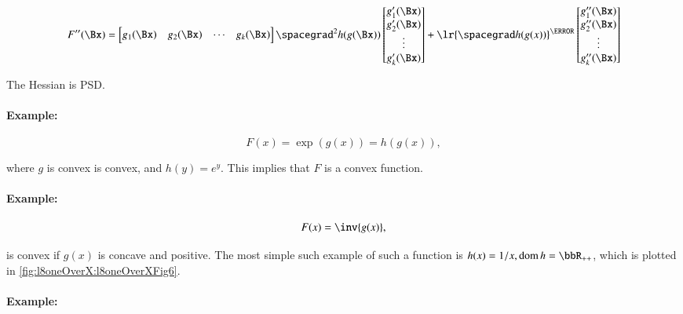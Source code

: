 \begin{equation}\label{eqn:convexOptimizationLecture8:240}
F''(\Bx)
=
\begin{bmatrix}
g_1(\Bx) & g_2(\Bx) & \cdots & g_k(\Bx)
\end{bmatrix}
\spacegrad^2 h(g(\Bx))
\begin{bmatrix}
g_1'(\Bx) \\ g_2'(\Bx) \\ \vdots \\ g_k'(\Bx)
\end{bmatrix}
+
\lr{ \spacegrad h(g(x)) }^\T
\begin{bmatrix}
g_1''(\Bx) \\ g_2''(\Bx) \\ \vdots \\ g_k''(\Bx)
\end{bmatrix}
\end{equation}

The Hessian is PSD.

\paragraph{Example:}

\begin{equation}\label{eqn:convexOptimizationLecture8:260}
F(x) = \exp( g(x) ) = h( g(x) ),
\end{equation}

where \( g \) is convex is convex, and \( h(y) = e^y \).  This implies that \( F \) is a convex function.

\paragraph{Example:}

\begin{equation}\label{eqn:convexOptimizationLecture8:280}
F(x) = \inv{g(x)},
\end{equation}

is convex if \( g(x) \) is concave and positive.  The most simple such example of such a function is \( h(x) = 1/x, \dom h = \bbR_{++} \), which is plotted in \cref{fig:l8oneOverX:l8oneOverXFig6}.


\paragraph{Example:}

